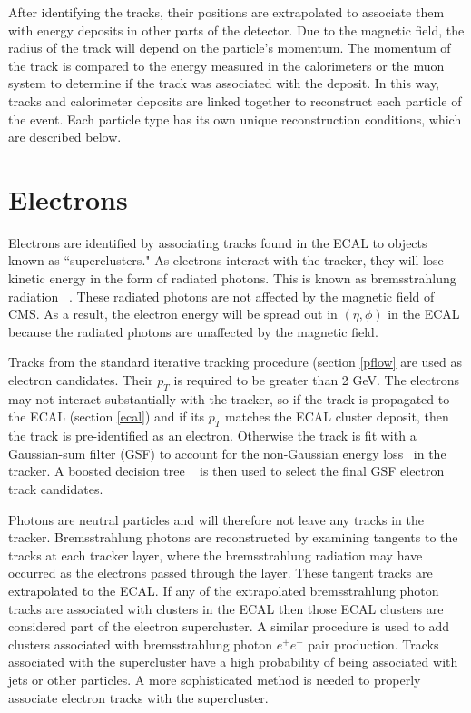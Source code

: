 \documentclass[oneside, letterpaper, oldfontcommands]{memoir}
\begin{document}
\qquad After identifying the tracks, their positions are extrapolated to associate them with energy deposits in other parts of the detector. Due to the magnetic field, the radius of the track will depend on the particle's momentum. The momentum of the track is compared to the energy measured in the calorimeters or the muon system to determine if the track was associated with the deposit. In this way, tracks and calorimeter deposits are linked together to reconstruct each particle of the event. Each particle type has its own unique reconstruction conditions, which are described below.

\section{Electrons}\label{electrons}

\qquad Electrons are identified by associating tracks found in the ECAL to objects known as ``superclusters." As electrons interact with the tracker, they will lose kinetic energy in the form of radiated photons. This is known as bremsstrahlung radiation ~\cite{griffiths1999introduction}. These radiated photons are not affected by the magnetic field of CMS. As a result, the electron energy will be spread out in $(\eta,\phi)$ in the ECAL because the radiated photons are unaffected by the magnetic field. 

\qquad Tracks from the standard iterative tracking procedure (section \ref{pflow} are used as electron candidates. Their $p_{T}$ is required to be greater than 2 GeV. The electrons may not interact substantially with the tracker, so if the track is propagated to the ECAL (section \ref{ecal}) and if its $p_{T}$ matches the ECAL cluster deposit, then the track is pre-identified as an electron. Otherwise the track is fit with a Gaussian-sum filter (GSF) to account for the non-Gaussian energy loss~\cite{Adam:815410} in the tracker. A boosted decision tree ~\cite{Hocker:2007ht} is then used to select the final GSF electron track candidates.  

\qquad Photons are neutral particles and will therefore not leave any tracks in the tracker. Bremsstrahlung photons are reconstructed by examining tangents to the tracks at each tracker layer, where the bremsstrahlung radiation may have occurred as the electrons passed through the layer. These tangent tracks are extrapolated to the ECAL. If any of the extrapolated bremsstrahlung photon tracks are associated with clusters in the ECAL then those ECAL clusters are considered part of the electron supercluster. A similar procedure is used to add clusters associated with bremsstrahlung photon $e^{+}e^{-}$ pair production. Tracks associated with the supercluster have a high probability of being associated with jets or other particles. A more sophisticated method is needed to properly associate electron tracks with the supercluster.
\end{document}
